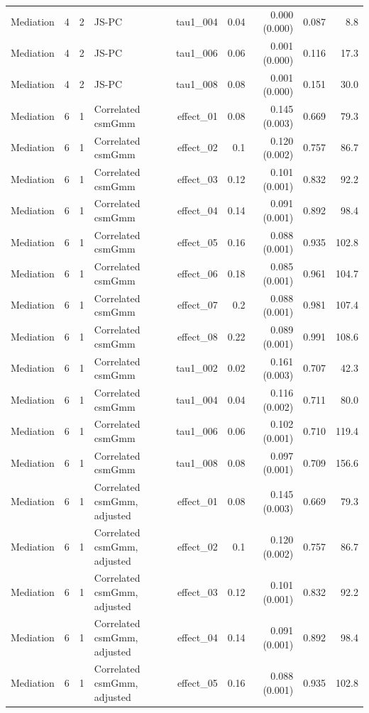 \begin{longtable}{lcclrrrrr}
Mediation & 4 & 2 & JS-PC & tau1\_004 & 0.04 & 0.000 (0.000) & 0.087 & 8.8\\
Mediation & 4 & 2 & JS-PC & tau1\_006 & 0.06 & 0.001 (0.000) & 0.116 & 17.3\\
Mediation & 4 & 2 & JS-PC & tau1\_008 & 0.08 & 0.001 (0.000) & 0.151 & 30.0\\
Mediation & 6 & 1 & Correlated csmGmm & effect\_01 & 0.08 & 0.145 (0.003) & 0.669 & 79.3\\
Mediation & 6 & 1 & Correlated csmGmm & effect\_02 & 0.1 & 0.120 (0.002) & 0.757 & 86.7\\
Mediation & 6 & 1 & Correlated csmGmm & effect\_03 & 0.12 & 0.101 (0.001) & 0.832 & 92.2\\
Mediation & 6 & 1 & Correlated csmGmm & effect\_04 & 0.14 & 0.091 (0.001) & 0.892 & 98.4\\
Mediation & 6 & 1 & Correlated csmGmm & effect\_05 & 0.16 & 0.088 (0.001) & 0.935 & 102.8\\
Mediation & 6 & 1 & Correlated csmGmm & effect\_06 & 0.18 & 0.085 (0.001) & 0.961 & 104.7\\
Mediation & 6 & 1 & Correlated csmGmm & effect\_07 & 0.2 & 0.088 (0.001) & 0.981 & 107.4\\
Mediation & 6 & 1 & Correlated csmGmm & effect\_08 & 0.22 & 0.089 (0.001) & 0.991 & 108.6\\
Mediation & 6 & 1 & Correlated csmGmm & tau1\_002 & 0.02 & 0.161 (0.003) & 0.707 & 42.3\\
Mediation & 6 & 1 & Correlated csmGmm & tau1\_004 & 0.04 & 0.116 (0.002) & 0.711 & 80.0\\
Mediation & 6 & 1 & Correlated csmGmm & tau1\_006 & 0.06 & 0.102 (0.001) & 0.710 & 119.4\\
Mediation & 6 & 1 & Correlated csmGmm & tau1\_008 & 0.08 & 0.097 (0.001) & 0.709 & 156.6\\
Mediation & 6 & 1 & Correlated csmGmm, adjusted & effect\_01 & 0.08 & 0.145 (0.003) & 0.669 & 79.3\\
Mediation & 6 & 1 & Correlated csmGmm, adjusted & effect\_02 & 0.1 & 0.120 (0.002) & 0.757 & 86.7\\
Mediation & 6 & 1 & Correlated csmGmm, adjusted & effect\_03 & 0.12 & 0.101 (0.001) & 0.832 & 92.2\\
Mediation & 6 & 1 & Correlated csmGmm, adjusted & effect\_04 & 0.14 & 0.091 (0.001) & 0.892 & 98.4\\
Mediation & 6 & 1 & Correlated csmGmm, adjusted & effect\_05 & 0.16 & 0.088 (0.001) & 0.935 & 102.8\\

\end{longtable}
